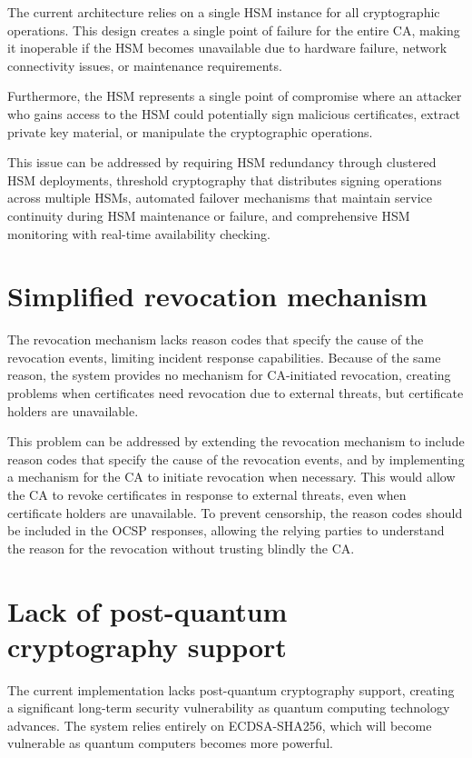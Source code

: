 The current architecture relies on a single HSM instance for all cryptographic operations. 
This design creates a single point of failure for the entire CA, making it inoperable if the HSM 
becomes unavailable due to hardware failure, network connectivity issues, or maintenance requirements.

Furthermore, the HSM represents a single point of compromise where an attacker who gains access to 
the HSM could potentially sign malicious certificates, extract private key material, or manipulate 
the cryptographic operations. 

This issue can be addressed by requiring HSM redundancy through clustered HSM deployments, threshold 
cryptography that distributes signing operations across multiple HSMs, automated failover mechanisms 
that maintain service continuity during HSM maintenance or failure, and comprehensive HSM monitoring 
with real-time availability checking. 

\section{Simplified revocation mechanism}

The revocation mechanism lacks reason codes that specify the cause of the revocation events, 
limiting incident response capabilities. Because of the same reason, the system provides no mechanism 
for CA-initiated revocation, creating problems when certificates need revocation due to external 
threats, but certificate holders are unavailable.

This problem can be addressed by extending the revocation mechanism to include reason codes that specify 
the cause of the revocation events, and by implementing a mechanism for the CA to initiate revocation 
when necessary. This would allow the CA to revoke certificates in response to external threats, 
even when certificate holders are unavailable. To prevent censorship, the reason codes should be included
in the OCSP responses, allowing the relying parties to understand the reason for the revocation
without trusting blindly the CA.


\section{Lack of post-quantum cryptography support}

The current implementation lacks post-quantum cryptography support, creating a significant 
long-term security vulnerability as quantum computing technology advances. The system relies entirely 
on ECDSA-SHA256, which will become vulnerable as quantum computers becomes more powerful.

